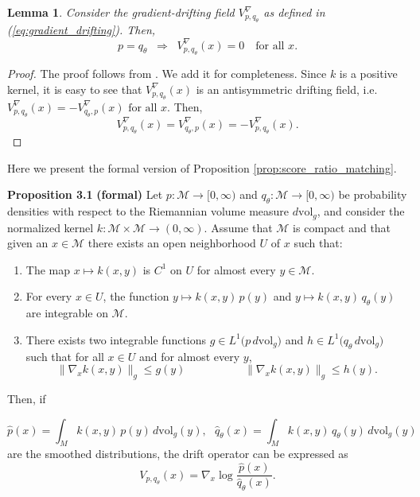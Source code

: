 \documentclass{article}
\theoremstyle{plain}
\newtheorem{lemma}[theorem]{Lemma}
\newcommand{\M}{\mathcal{M}}
\begin{document}
\begin{lemma}  Consider the gradient-drifting field $V^\nabla_{p,q_\theta}$ as defined in (\ref{eq:gradient_drifting}). Then, 
\[
p = q_\theta \;\;\Rightarrow\;\; V^\nabla_{p,q_\theta}(x) = 0 \quad \text{for all } x.
\]
\end{lemma}

\begin{proof}
The proof follows from \cite{Deng_2026_Drift}. We add it for completeness. Since $k$ is a positive kernel, it is easy to see that $V^\nabla_{p,q_\theta}(x)$ is an antisymmetric drifting field, i.e. $V^\nabla_{p,q_\theta}(x) = -V^\nabla_{q_\theta,p}(x)$ $\text{for all } x$. Then, 
\[ V^\nabla_{p,q_\theta}(x) =  V^\nabla_{q_\theta,p}(x) = - V^\nabla_{p,q_\theta}(x).\]   
\end{proof}

Here we present the formal version of Proposition \ref{prop:score_ratio_matching}.


\textbf{Proposition 3.1} \textbf{(formal)}\label{prop: gaussian_kernel smoothed}
Let $p:\M\to[0,\infty)$ and $q_\theta:\M\to[0,\infty)$ be probability densities with respect to the Riemannian volume measure $d\mathrm{vol}_g$, and consider the normalized kernel  $
k:\M\times \M \to (0,\infty).$ Assume that $\mathcal{M}$ is compact and that given an $x\in \M$ there exists an open neighborhood $U$ of $x$ such that:

\begin{enumerate}
    \item The map $ x \mapsto k(x,y) $
    is $C^1$ on $U$ for almost every $y \in \mathcal{M}.$

    \item For every $x\in U$, the function $
    y \mapsto k(x,y)\,p(y)$ and $
    y \mapsto k(x,y)\,q_\theta(y)$
    are integrable on $\M$.

    \item There exists two integrable functions $
    g \in L^1\!\bigl(p\,d\mathrm{vol}_g\bigr)$ and $
    h \in L^1\!\bigl(q_\theta\,d\mathrm{vol}_g\bigr)$
    such that for all $x\in U$ and for almost every $y$,
    \[
    \|\nabla_{x} k(x,y)\|_g \le g(y)  \hspace{2cm  }\, \, \,  \|\nabla_{x} k(x,y)\|_g \le h(y). 
    \]
\end{enumerate}

Then, if 


\[ \hat p(x)=\int_M k(x,y)\,p(y)\,d\mathrm{vol}_g(y),
\, \, \, \, \hat q_\theta(x) = \int_M k(x,y)\,q_\theta(y)\,d\mathrm{vol}_g(y)\]
are the smoothed distributions, the drift operator can be expressed as 
\[V_{p,q_\theta} (x) = \nabla_{x}\log \frac{\hat p (x)}{\hat q_\theta (x)}.\]
\end{document}
